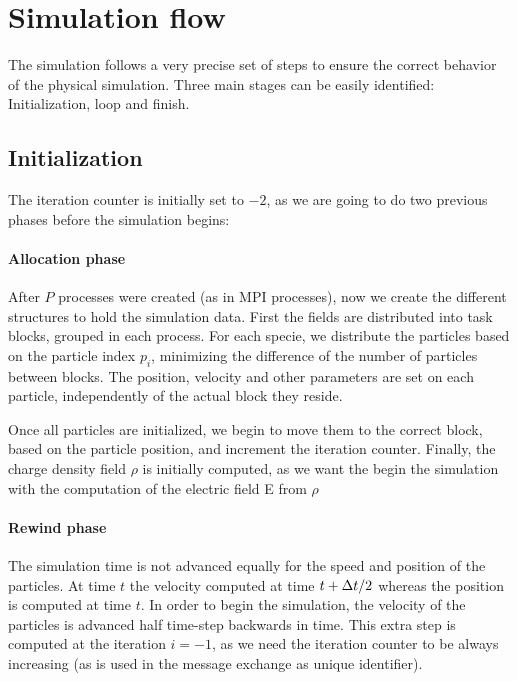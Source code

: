 \section{Simulation flow}

The simulation follows a very precise set of steps to ensure the correct 
behavior of the physical simulation. Three main stages can be easily identified: 
Initialization, loop and finish.

\subsection{Initialization}

The iteration counter is initially set to $-2$, as we are going to do two 
previous phases before the simulation begins:

\paragraph{Allocation phase}
After $P$ processes were created (as in MPI processes), now we create the 
different structures to hold the simulation data. First the fields are 
distributed into task blocks, grouped in each process. For each specie, we 
distribute the particles based on the particle index $p_i$, minimizing the 
difference of the number of particles between blocks. The position, velocity and 
other parameters are set on each particle, independently of the actual block 
they reside.

Once all particles are initialized, we begin to move them to the correct block, 
based on the particle position, and increment the iteration counter. Finally, 
the charge density field $\rho$ is initially computed, as we want the begin the 
simulation with the computation of the electric field E from $\rho$

\paragraph{Rewind phase} The simulation time is not advanced equally for the 
speed and position of the particles. At time $t$ the velocity computed at time 
$t + \Delta t/2$ whereas the position is computed at time $t$. In order to begin the 
simulation, the velocity of the particles is advanced half time-step backwards 
in time. This extra step is computed at the iteration $i=-1$, as we need the 
iteration counter to be always increasing (as is used in the message exchange as 
unique identifier).

